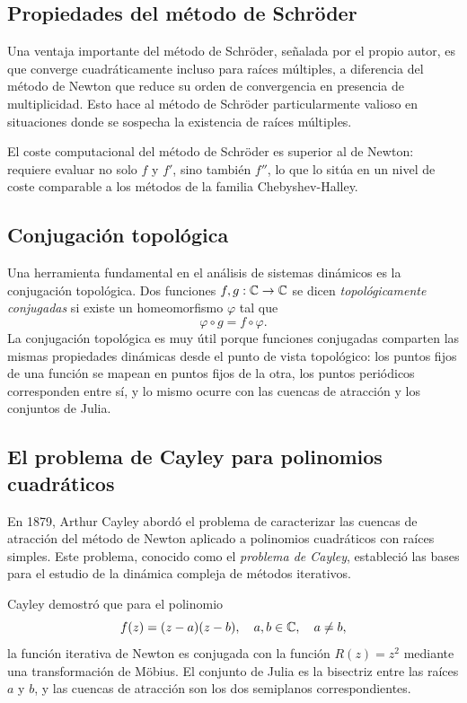\subsection{Propiedades del método de Schröder}

Una ventaja importante del método de Schröder, señalada por el propio autor, es que converge cuadráticamente incluso para raíces múltiples, a diferencia del método de Newton que reduce su orden de convergencia en presencia de multiplicidad. Esto hace al método de Schröder particularmente valioso en situaciones donde se sospecha la existencia de raíces múltiples.

El coste computacional del método de Schröder es superior al de Newton: requiere evaluar no solo $f$ y $f'$, sino también $f''$, lo que lo sitúa en un nivel de coste comparable a los métodos de la familia Chebyshev-Halley.

\subsection{Conjugación topológica}

Una herramienta fundamental en el análisis de sistemas dinámicos es la conjugación topológica. Dos funciones $f,g: \mathbb{C} \to \mathbb{C}$ se dicen \emph{topológicamente conjugadas} si existe un homeomorfismo $\varphi$ tal que
$$
\varphi\circ g=f\circ \varphi.
$$
La conjugación topológica es muy útil porque funciones conjugadas comparten las mismas propiedades dinámicas desde el punto de vista topológico: los puntos fijos de una función se mapean en puntos fijos de la otra, los puntos periódicos corresponden entre sí, y lo mismo ocurre con las cuencas de atracción y los conjuntos de Julia.

\subsection{El problema de Cayley para polinomios cuadráticos}

En 1879, Arthur Cayley \cite{Cay} abordó el problema de caracterizar las cuencas de atracción del método de Newton aplicado a polinomios cuadráticos con raíces simples. Este problema, conocido como el \emph{problema de Cayley}, estableció las bases para el estudio de la dinámica compleja de métodos iterativos.

Cayley demostró que para el polinomio
\begin{equation}
f(z)=(z-a)(z-b),\quad a,b\in \mathbb{C}, \quad a\ne b,
\label{eq:poly_simple}
\end{equation}
la función iterativa de Newton es conjugada con la función $R(z)=z^2$ mediante una transformación de Möbius. El conjunto de Julia es la bisectriz entre las raíces $a$ y $b$, y las cuencas de atracción son los dos semiplanos correspondientes.

